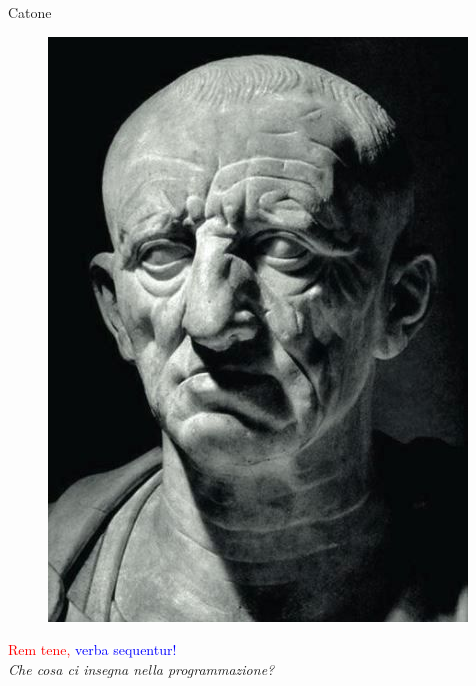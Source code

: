 \documentclass{beamer}
\begin{document}
\begin{frame}
{\centerline{Catone}}

\begin{figure}[htp]
    \centering
     \includegraphics[width=.32\textwidth]{P2023.SentirMeditarEProgrammar.Pillola/CatoneIlCensore.jpg}
    \label{F:CatoneIlCensore}
\end{figure}

\begin{center}
    \Large{\textcolor{red}{Rem tene,} \textcolor{blue}{verba sequentur!}}\\
    \textit{Che cosa ci insegna nella programmazione?}
\end{center}
\end{frame}
\end{document}

